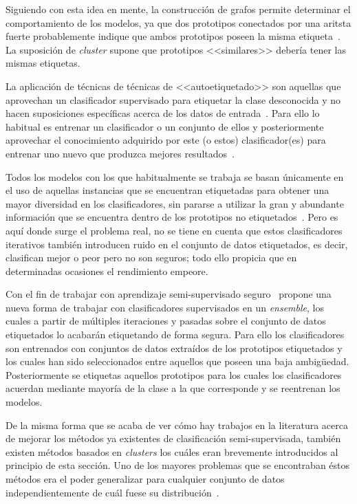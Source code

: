 Siguiendo con esta idea en mente, la construcción de grafos permite determinar el comportamiento de los modelos, ya que dos prototipos conectados por una aritsta fuerte probablemente indique que ambos prototipos poseen la misma etiqueta~\cite{wang2013semi}. La suposición de \textit{cluster} supone que prototipos <<similares>> debería tener las mismas etiquetas.

La aplicación de técnicas de técnicas de <<autoetiquetado>> son aquellas que aprovechan un clasificador supervisado para etiquetar la clase desconocida y no hacen suposiciones específicas acerca de los datos de entrada~\cite{triguero2015self}. Para ello lo habitual es entrenar un clasificador o un conjunto de ellos y posteriormente aprovechar el conocimiento adquirido por este (o estos) clasificador(es) para entrenar uno nuevo que produzca mejores resultados~\cite{blum1998combining, zhou2005tri}.

Todos los modelos con los que habitualmente se trabaja se basan únicamente en el uso de aquellas instancias que se encuentran etiquetadas para obtener una mayor diversidad en los clasificadores, sin pararse a utilizar la gran y abundante información que se encuentra dentro de los prototipos no etiquetados~\cite{zhao2021safe}. Pero es aquí donde surge el problema real, no se tiene en cuenta que estos clasificadores iterativos también introducen ruido en el conjunto de datos etiquetados, es decir, clasifican mejor o peor pero no son seguros; todo ello propicia que en determinadas ocasiones el rendimiento empeore.

Con el fin de trabajar con aprendizaje semi-supervisado seguro~\cite{zhao2021safe} propone una nueva forma de trabajar con clasificadores supervisados en un \textit{ensemble}, los cuales a partir de múltiples iteraciones y pasadas sobre el conjunto de datos etiquetados lo acabarán etiquetando de forma segura. Para ello los clasificadores son entrenados con conjuntos de datos extraídos de los prototipos etiquetados y los cuales han sido seleccionados entre aquellos que poseen una baja ambigüedad. Posteriormente se etiquetas aquellos prototipos para los cuales los clasificadores acuerdan mediante mayoría de la clase a la que corresponde y se reentrenan los modelos.

De la misma forma que se acaba de ver cómo hay trabajos en la literatura acerca de mejorar los métodos ya existentes de clasificación semi-supervisada, también existen métodos basados en \textit{clusters} los cuáles eran brevemente introducidos al principio de esta sección. Uno de los mayores problemas que se encontraban éstos métodos era el poder generalizar para cualquier conjunto de datos independientemente de cuál fuese su distribución~\cite{adankon2011help, gan2013using}.

